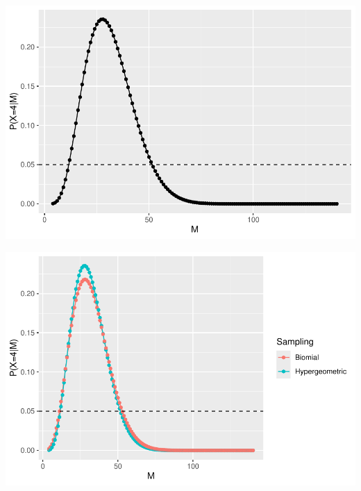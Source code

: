 \begin{frame}

\begin{center}
\includegraphics[height = .8\textheight]{figure/plot1-2}
\end{center}

\end{frame}

\begin{frame}

\begin{center}
\includegraphics[height = .8\textheight]{figure/plot1-3}
\end{center}

\end{frame}



